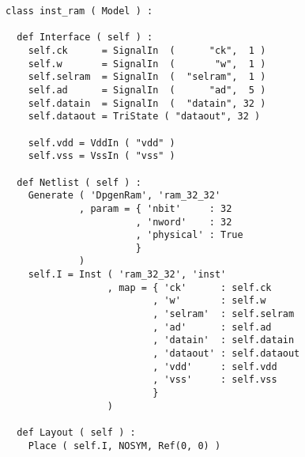 \begin{itemize}
\begin{verbatim}
class inst_ram ( Model ) :

  def Interface ( self ) :
    self.ck      = SignalIn  (      "ck",  1 )
    self.w       = SignalIn  (       "w",  1 )
    self.selram  = SignalIn  (  "selram",  1 )
    self.ad      = SignalIn  (      "ad",  5 )
    self.datain  = SignalIn  (  "datain", 32 )
    self.dataout = TriState ( "dataout", 32 )
    
    self.vdd = VddIn ( "vdd" )
    self.vss = VssIn ( "vss" )
    
  def Netlist ( self ) :
    Generate ( 'DpgenRam', 'ram_32_32'
             , param = { 'nbit'     : 32
                       , 'nword'    : 32
                       , 'physical' : True
                       }
             )
    self.I = Inst ( 'ram_32_32', 'inst'
                  , map = { 'ck'      : self.ck
                          , 'w'       : self.w
                          , 'selram'  : self.selram
                          , 'ad'      : self.ad
                          , 'datain'  : self.datain
                          , 'dataout' : self.dataout
                          , 'vdd'     : self.vdd
                          , 'vss'     : self.vss
                          }
                  )     
    
  def Layout ( self ) :
    Place ( self.I, NOSYM, Ref(0, 0) )
\end{verbatim}
\end{itemize}
